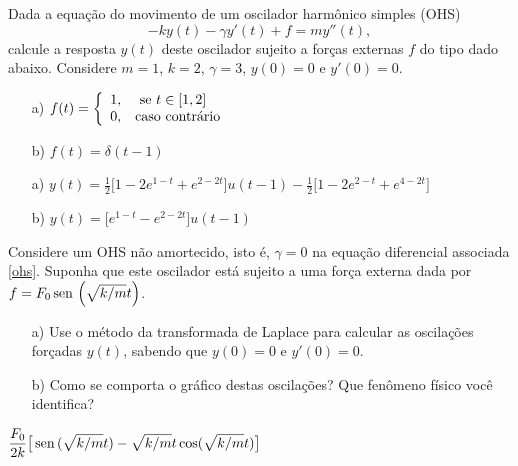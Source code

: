 \begin{exer}
Dada a equação do movimento de um oscilador harmônico simples (OHS)
\begin{equation}\label{ohs}
-k y(t) - \gamma y'(t) + f = my''(t),
\end{equation}
calcule a resposta $y(t)$ deste oscilador sujeito a forças externas $f$ do tipo dado abaixo. Considere $m=1$, $k=2$, $\gamma =3$, $y(0)=0$ e $y'(0)=0$.
\begin{itemize}
  \item[a)] $\displaystyle f(t) = \left\{
                                         \begin{array}{ll}
                                           1, & \hbox{ se } t\in [1,2] \\
                                           0, & \hbox{caso contrário}
                                         \end{array}
                                       \right.
  $
  \item[b)] $\displaystyle f(t) = \delta (t-1)$
\end{itemize}
\end{exer}
\begin{resp}
\begin{itemize}
\item[a)] $\displaystyle y(t) = \frac{1}{2}\big[ 1 -2 e^{1-t} + e^{2-2t} \big]u(t-1) - \frac{1}{2}\big[ 1 - 2 e^{2-t} + e^{4 - 2t} \big]$
  \item[b)] $\displaystyle y(t) = \big[ e^{1-t} - e^{2-2t}\big] u(t-1)$
\end{itemize}
\end{resp}
\begin{exer}
Considere um OHS não amortecido, isto é, $\gamma = 0$ na equação diferencial associada \eqref{ohs}. Suponha que este oscilador está sujeito a uma força externa dada por $f = F_0 \operatorname{sen}\, \left( \sqrt{k/m} t\right)$.
\begin{itemize}
  \item[a)] Use o método da transformada de Laplace para calcular as oscilações forçadas $y(t)$, sabendo que $y(0) = 0$ e $y'(0)=0$.
  \item[b)] Como se comporta o gráfico destas oscilações? Que fenômeno físico você identifica?
\end{itemize}
\end{exer}
\begin{resp}
 $\displaystyle \frac{F_0}{2k} \big[ \operatorname{sen}\,(\sqrt{k/m}t) - \sqrt{k/m}t \cos(\sqrt{k/m}t) \big] $
\end{resp}

